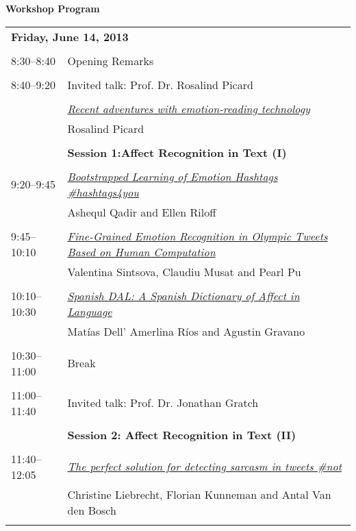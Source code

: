 \setlength{\parindent}{0in}
\setlength{\parskip}{2ex}
\renewcommand{\baselinestretch}{0.87}

\begin{center}
{\Large \bf
  Workshop Program
}
\end{center}
\vspace{3mm}
\begin{tabular}{p{20mm}p{128mm}}
\multicolumn{2}{l}{\bf Friday, June 14, 2013
} \\
\\
8:30--8:40 & Opening Remarks
 \\
\\
8:40--9:20 & Invited talk: Prof. Dr. Rosalind Picard
 \\
\\
 & \hyperlink{page.1}{\em Recent adventures with emotion-reading technology}\\
         & Rosalind Picard \\
\\

 & {\bf Session 1:Affect Recognition in Text (I)
} \\
\\
9:20--9:45 & \hyperlink{page.2}{\em Bootstrapped Learning of Emotion Hashtags \#hashtags4you}\\
         & Ashequl Qadir and Ellen Riloff \\
\\

9:45--10:10 & \hyperlink{page.12}{\em Fine-Grained Emotion Recognition in Olympic Tweets Based on Human Computation}\\
         & Valentina Sintsova, Claudiu Musat and Pearl Pu \\
\\

10:10--10:30 & \hyperlink{page.21}{\em Spanish DAL: A Spanish Dictionary of Affect in Language}\\
         & Mat\'{i}as Dell' Amerlina R\'{i}os and Agustin Gravano \\
\\

10:30--11:00 & Break
 \\
\\
11:00--11:40 & Invited talk: Prof. Dr. Jonathan Gratch
 \\
\\
 & {\bf Session 2: Affect Recognition in Text (II)
} \\
\\
11:40--12:05 & \hyperlink{page.29}{\em The perfect solution for detecting sarcasm in tweets \#not}\\
         & Christine Liebrecht, Florian Kunneman and Antal Van den Bosch \\
\\


\end{tabular}
